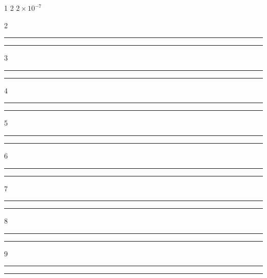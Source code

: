 \documentclass{article}
\begin{document}
\vspace{0.1in}

1 \hspace{1.3in}  2 \hspace{2.2in} $2\times 10^{-7}$

\vspace{0.1in}

2 \hspace{1.3in}  \rule{0.5in}{0.01in} \hspace{1.7in} \rule{0.5in}{0.01in}

\vspace{0.1in}

3 \hspace{1.3in}  \rule{0.5in}{0.01in} \hspace{1.7in} \rule{0.5in}{0.01in}

\vspace{0.1in}

4 \hspace{1.3in}  \rule{0.5in}{0.01in} \hspace{1.7in} \rule{0.5in}{0.01in}

\vspace{0.1in}

5 \hspace{1.3in}  \rule{0.5in}{0.01in} \hspace{1.7in} \rule{0.5in}{0.01in}

\vspace{0.1in}

6 \hspace{1.3in}  \rule{0.5in}{0.01in} \hspace{1.7in} \rule{0.5in}{0.01in}

\vspace{0.1in}

7 \hspace{1.3in}  \rule{0.5in}{0.01in} \hspace{1.7in} \rule{0.5in}{0.01in}

\vspace{0.1in}

8 \hspace{1.3in}  \rule{0.5in}{0.01in} \hspace{1.7in} \rule{0.5in}{0.01in}

\vspace{0.1in}

9 \hspace{1.3in}  \rule{0.5in}{0.01in} \hspace{1.7in} \rule{0.5in}{0.01in}
\end{document}

